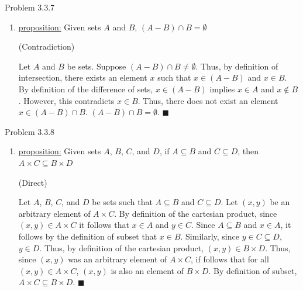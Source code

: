 \documentclass{article}
\theoremstyle{definition}
\begin{document}
	\vspace{1cm}

	\noindent Problem 3.3.7  \vspace{0.3cm}

	\begin{enumerate}
		\item[ii]
		\underline{proposition:} Given sets $A$ and $B$, $(A-B)\cap
		B=\emptyset$

		\vspace{.2cm}

		 (Contradiction)

		Let $A$ and $B$ be sets. Suppose $(A-B)\cap B\not=\emptyset$. Thus,
		by definition of intersection, there exists an element $x$ such that
		$x\in (A-B)$ and $x\in B$. By definition of the difference of sets,
		$x\in (A-B)$ implies $x\in A$ and $x\not\in B$. However, this
		contradicts $x\in B$. Thus, there does not exist an element $x\in
		(A-B)\cap B$.  $(A-B)\cap B=\emptyset$.  $\blacksquare$

	\end{enumerate}
	\vspace{1cm}


	\noindent Problem 3.3.8  \vspace{0.3cm}

	\begin{enumerate}
		\item[i]
		\underline{proposition:} Given sets $A$, $B$, $C$, and $D$, if
		$A\subseteq B$ and $C\subseteq D$, then $A\times C\subseteq B\times
		D$

		\vspace{.2cm}

		 (Direct)

		Let $A$, $B$, $C$, and $D$ be sets such that $A\subseteq B$ and
		$C\subseteq D$. Let $(x,y)$ be an arbitrary element of $A\times C$.
		By definition of the cartesian product, since $(x,y)\in A\times C$
		it follows that $x\in A$ and $y\in C$. Since $A\subseteq B$ and
		$x\in A$, it follows by the definition of subset that $x\in B$.
		Similarly, since $y\in C\subseteq D$, $y\in D$. Thus, by definition
		of the cartesian product, $(x,y)\in B\times D$. Thus, since $(x,y)$
		was an arbitrary element of $A\times C$, if follows that for all
		$(x,y)\in A\times C$, $(x,y)$ is also an element of $B\times D$. By
		definition of subset, $A\times C \subseteq B\times D$.
		$\blacksquare$
	\end{enumerate}
	\vspace{1cm}
\end{document}
